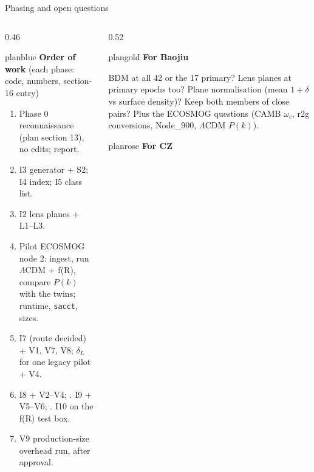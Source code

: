\documentclass[UTF8]{beamer}
\begin{document}
\begin{frame}{Phasing and open questions}
  \footnotesize
  \begin{columns}[T,totalwidth=\textwidth]
    \begin{column}{0.46\textwidth}
      \begin{phasebox}{planblue}
        {\color{planblue}\bfseries Order of work} (each phase: code, numbers, section-16 entry)\par\smallskip
        \scriptsize
        \begin{enumerate}\setlength\itemsep{0.2em}
          \item Phase 0 reconnaissance (plan section 13), no edits; report.
          \item I3 generator + S2; I4 index; I5 class list.
          \item I2 lens planes + L1--L3.
          \item Pilot ECOSMOG node 2: ingest, run $\Lambda$CDM + f(R), compare $P(k)$ with the twins; runtime, \texttt{sacct}, sizes.
          \item I7 (route decided) + V1, V7, V8; $\delta_L$ for one legacy pilot + V4.
          \item I8 + V2--V4; . I9 + V5--V6; . I10 on the f(R) test box.
          \setcounter{enumi}{8}
          \item V9 production-size overhead run, after approval.
        \end{enumerate}
      \end{phasebox}
    \end{column}
    \hfill
    \begin{column}{0.52\textwidth}
      \begin{phasebox}[colback=planpale]{plangold}
        {\color{plangold}\bfseries For Baojiu}\par\smallskip
        \scriptsize
        BDM at all 42 or the 17 primary? Lens planes at primary epochs too? Plane normalisation (mean $1+\delta$ vs surface density)?
        Keep both members of close pairs? Plus the ECOSMOG questions (CAMB $\omega_c$, r2g conversions, Node\_900, $\Lambda$CDM $P(k)$).
      \end{phasebox}
      \vspace{0.3ex}
      \begin{phasebox}[colback=planpale]{planrose}
        {\color{planrose}\bfseries For CZ}\par\smallskip
        \scriptsize

\end{phasebox}
\end{column}
\end{columns}
\end{frame}
\end{document}
